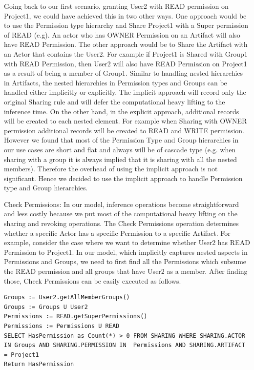 \documentclass[sigconf]{acmart}
\begin{document}
Going back to our first scenario, granting User2 with READ permission on Project1, we could have achieved this in two other ways. One approach would be to use the Permission type hierarchy and Share Project1 with a Super permission of READ (e.g). An actor who has OWNER Permission on an Artifact will also have READ Permission. The other approach would be to Share the Artifact with an Actor that contains the User2. For example if Project1 is Shared with Group1 with READ Permission, then User2 will also have READ Permission on Project1 as a result of being a member of Group1. Similar to handling nested hierarchies in Artifacts, the nested hierarchies in Permission types and Groups can be handled either implicitly or explicitly. The implicit approach will record only the original Sharing rule and will defer the computational heavy lifting to the inference time. On the other hand, in the explicit approach, additional records will be created to each nested element. For example when Sharing with OWNER permission additional records will be created to READ and WRITE permission. However we found that most of the Permission Type and Group hierarchies in our use cases are short and flat and always will be of cascade type (e.g. when sharing with a group it is always implied that it is sharing with all the nested members). Therefore the overhead of using the implicit approach is not significant. Hence we decided to use the implicit approach to handle Permission type and Group hierarchies.

Check Permissions: In our model, inference operations become straightforward and less costly because we put most of the computational heavy lifting on the sharing and revoking operations. The Check Permissions operation determines whether a specific Actor has a specific Permission to a specific Artifact. For example, consider the case where we want to determine whether User2 has READ Permission to Project1. In our model, which implicitly captures nested aspects in Permissions and Groups, we need to first find all the Permissions which subsume the READ permission and all groups that have User2 as a member. After finding those, Check Permissions can be easily executed as follows.

\begin{lstlisting}
Groups := User2.getAllMemberGroups()
Groups := Groups U User2
Permissions := READ.getSuperPermissions()
Permissions := Permissions U READ
SELECT HasPermission as Count(*) > 0 FROM SHARING WHERE SHARING.ACTOR IN Groups AND SHARING.PERMISSION IN  Permissions AND SHARING.ARTIFACT = Project1
Return HasPermission
\end{lstlisting}
\end{document}
